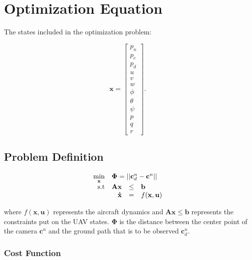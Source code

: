 \section*{Optimization Equation}

The states included in the optimization problem:
	
\begin{equation}
	\mathbf{x} = 
	\begin{bmatrix}
		p_n \\ p_e \\ p_d \\
		u \\ v   \\ w   \\ 
		\phi \\ \theta \\ \psi \\
		p \\ q \\ r
	\end{bmatrix}.
\end{equation}


\subsection*{Problem Definition}

\begin{equation}
	\begin{array}{rrclcl}
		\displaystyle \min_{\mathbf{x}} & \multicolumn{3}{l}{\bm{\Phi} = ||\mathbf{c}^n_d - \mathbf{c}^n||} \\
		\textrm{s.t}
		& \mathbf{A} \mathbf{x} & \leq & \mathbf{b} \\
		& \displaystyle \mathbf{\dot{x}} & = & f(\mathbf{x},\mathbf{u}) \\
	\end{array}
\end{equation}

where $f(\mathbf{x},\mathbf{u})$ represents the aircraft dynamics and $\mathbf{A} \mathbf{x} \leq \mathbf{b}$ represents the constraints put on the UAV states. $\bm{\Phi}$ is the distance between the center point of the camera $\mathbf{c}^n$ and the ground path that is to be observed $\mathbf{c}^n_d$.


\subsubsection*{Cost Function}

